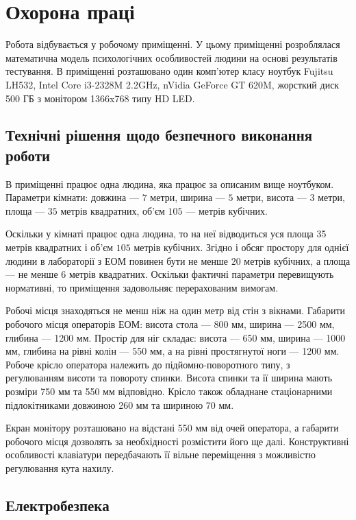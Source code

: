 \chapter{Охорона праці}

Робота відбувається у робочому приміщенні.
У цьому приміщенні розроблялася математична модель психологічних особливостей
людини на основі результатів тестування.
В приміщенні розташовано один комп’ютер класу ноутбук Fujitsu LH532,
Intel Core i3-2328M 2.2GHz, nVidia GeForce GT 620M,
жорсткий диск 500 ГБ з монітором 1366x768 типу HD LED.

\section{Технічні рішення щодо безпечного виконання роботи}

В приміщенні працює одна людина, яка працює за описаним вище ноутбуком.
Параметри кімнати:
довжина --- $7$ метри, ширина --- $5$ метри, висота --- $3$ метри,
площа --- $35$ метрів квадратних, об’єм $105$ --- метрів кубічних.

Оскільки у кімнаті працює одна людина, то на неї відводиться уся площа
35 метрів квадратних і об’єм $105$ метрів кубічних.
Згідно \cite{NPAOP} і \cite{DSanPiN} обсяг простору для однієї людини
в лабораторії з ЕОМ повинен бути не менше $20$ метрів кубічних,
а площа --- не менше $6$ метрів квадратних.
Оскільки фактичні параметри перевищують нормативні,
то приміщення задовольняє перерахованим вимогам.

Робочі місця знаходяться не менш ніж на один метр від стін з вікнами.
Габарити робочого місця операторів ЕОМ:
висота стола --- 800 мм, ширина --- 2500 мм, глибина --- 1200 мм.
Простір для ніг складає: висота --- 650 мм, ширина --- 1000 мм,
глибина на рівні колін --- 550 мм, а на рівні простягнутої ноги --- 1200 мм.
Робоче крісло оператора належить до підйомно-поворотного типу,
з регулюванням висоти та повороту спинки.
Висота спинки та її ширина мають розміри 750 мм та 550 мм відповідно.
Крісло також обладнане стаціонарними підлокітниками довжиною 260 мм
та шириною 70 мм.

Екран монітору розташовано на відстані 550 мм від очей оператора,
а габарити робочого місця дозволять за необхідності розмістити його ще далі.
Конструктивні особливості клавіатури передбачають її вільне переміщення
з можливістю регулювання кута нахилу.

\section{Електробезпека}

